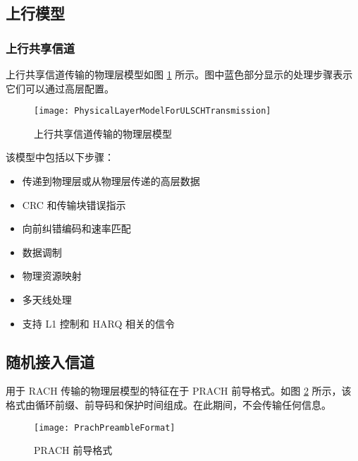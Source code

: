 \documentclass[cn,hazy,blue,14pt,screen,device=normal]{elegantnote}
\begin{document}
\subsection{上行模型}
\subsubsection{上行共享信道}
上行共享信道传输的物理层模型如图 \ref{PhysicalLayerModelForULSCHTransmission} 所示。图中蓝色部分显示的处理步骤表示它们可以通过高层配置。
\begin{figure}[!htbp]
	\centering
	\texttt{[image: PhysicalLayerModelForULSCHTransmission]}
	\caption{上行共享信道传输的物理层模型}
	\label{PhysicalLayerModelForULSCHTransmission}
\end{figure}

该模型中包括以下步骤：
\begin{itemize}[leftmargin=2cm]
	\item 传递到物理层或从物理层传递的高层数据
	\item CRC 和传输块错误指示
	\item 向前纠错编码和速率匹配
	\item 数据调制
	\item 物理资源映射
	\item 多天线处理
	\item 支持 L1 控制和 HARQ 相关的信令
\end{itemize}

\subsection{随机接入信道}
用于 RACH 传输的物理层模型的特征在于 PRACH 前导格式。如图 \ref{PrachPreambleFormat} 所示，该格式由循环前缀、前导码和保护时间组成。在此期间，不会传输任何信息。

\begin{figure}[!htbp]
	\centering
	\texttt{[image: PrachPreambleFormat]}
	\caption{PRACH 前导格式}
	\label{PrachPreambleFormat}
\end{figure}
\end{document}
